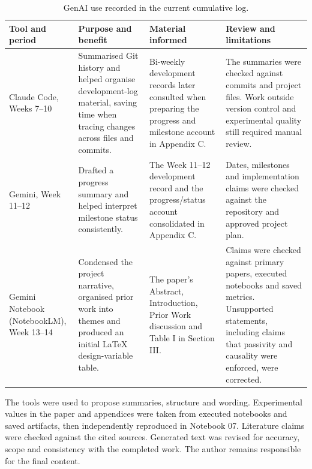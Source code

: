 \begin{table}[htbp]
    \caption{GenAI use recorded in the current cumulative log.}
    \label{tab:appendix-a-summary}
    \centering
    \scriptsize
    \begin{tabular}{@{}p{}p{}
                         p{}p{}@{}}
        \toprule
        Tool and period & Purpose and benefit & Material informed
          & Review and limitations \\
        \midrule
        Claude Code,
        Weeks 7--10
          & Summarised Git history and helped organise development-log
            material, saving time when tracing changes across files and
            commits.
          & Bi-weekly development records later consulted when preparing the
            progress and milestone account in Appendix C.
          & The summaries were checked against commits and project files.
            Work outside version control and experimental quality still
            required manual review. \\
        Gemini,
        Week 11--12
          & Drafted a progress summary and helped interpret milestone status
            consistently.
          & The Week 11--12 development record and the progress/status account
            consolidated in Appendix C.
          & Dates, milestones and implementation claims were checked against
            the repository and approved project plan. \\
        Gemini Notebook
        (NotebookLM),
        Week 13--14
          & Condensed the project narrative, organised prior work into themes
            and produced an initial LaTeX design-variable table.
          & The paper's Abstract, Introduction, Prior Work discussion and
            Table I in Section III.
          & Claims were checked against primary papers, executed notebooks and
            saved metrics. Unsupported statements, including claims that
            passivity and causality were enforced, were corrected. \\
        \bottomrule
    \end{tabular}
\end{table}

The tools were used to propose summaries, structure and wording. Experimental
values in the paper and appendices were taken from executed notebooks and saved
artifacts, then independently reproduced in Notebook 07. Literature claims were
checked against the cited sources. Generated text was revised for accuracy,
scope and consistency with the completed work. The author remains responsible
for the final content.

\clearpage

